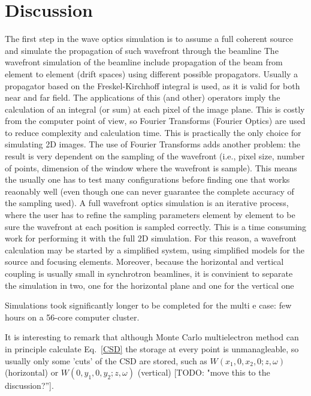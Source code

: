 \documentclass{iucr}              %
\newcommand{\todo}[1]{{\color{red}[TODO: "#1'']}}
\begin{document}
\section{Discussion} 

The first step in the wave optics simulation is to assume a full coherent source and simulate the propagation of such wavefront through the beamline
The wavefront simulation of the beamline include propagation of the beam from element to element (drift spaces) using different possible propagators. Usually a propagator based on the Freskel-Kirchhoff integral is used, as it is valid for both near and far field. The applications of this (and other) operators imply the calculation of an integral (or sum) at each pixel of the image plane. This is costly from the computer point of view, so Fourier Transforms (Fourier Optics) are used to reduce complexity and calculation time. This is practically the only choice for simulating 2D images. The use of Fourier Transforms adds another problem: the result is very dependent on the sampling of the wavefront (i.e., pixel size, number of points, dimension of the window where the wavefront is sample). This means the usually one has to test many configurations before finding one that works reaonably well (even though one can never guarantee the complete accuracy of the sampling used). A full wavefront optics simulation is an iterative process, where the user has to refine the sampling parameters element by element to be sure the wavefront at each position is sampled correctly. This is a time consuming work for performing it with the full 2D simulation. For this reason, a wavefront calculation may be started by a simplified system, using simplified models for the source and focusing elements. Moreover, because the horizontal and vertical coupling is usually small in synchrotron beamlines, it is convinient to separate the simulation in two, one for the horizontal plane and one for the vertical one


Simulations took significantly longer to be completed for the multi e case: few hours on a 56-core computer cluster.




It is interesting to remark that although Monte Carlo multielectron method can in principle calculate Eq.~\ref{CSD} the storage at every point is unmanagleable, so usually only some 'cuts' of the CSD are stored, such as $W(x_1,0,x_2,0;z,\omega)$ (horizontal) or $W(0,y_1,0,y_2;z,\omega)$ (vertical) \todo{move this to the discussion?}.
\end{document}
